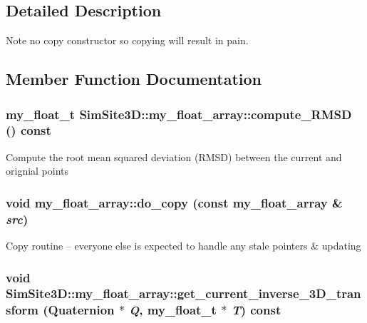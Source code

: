 \subsection{Detailed Description}
Note no copy constructor so copying will result in pain. 



\subsection{Member Function Documentation}
\subsubsection{\setlength{\rightskip}{0pt plus 5cm}my\_\-float\_\-t SimSite3D::my\_\-float\_\-array::compute\_\-RMSD () const\hspace{0.3cm}{\tt  [inline]}}\label{classSimSite3D_1_1my__float__array_ea4337b692bde44840c4affc07cf7095}


Compute the root mean squared deviation (RMSD) between the current and orignial points 
\subsubsection{\setlength{\rightskip}{0pt plus 5cm}void my\_\-float\_\-array::do\_\-copy (const \bf{my\_\-float\_\-array} \& {\em src})\hspace{0.3cm}{\tt  [private]}}\label{classSimSite3D_1_1my__float__array_06718ce6dbd8d6904e31f34943499e09}


Copy routine -- everyone else is expected to handle any stale pointers \& updating 
\subsubsection{\setlength{\rightskip}{0pt plus 5cm}void SimSite3D::my\_\-float\_\-array::get\_\-current\_\-inverse\_\-3D\_\-transform (Quaternion $\ast$ {\em Q}, my\_\-float\_\-t $\ast$ {\em T}) const\hspace{0.3cm}{\tt  [inline]}}\label{classSimSite3D_1_1my__float__array_f341a7e9e7bde491843bf95e61650eee}



